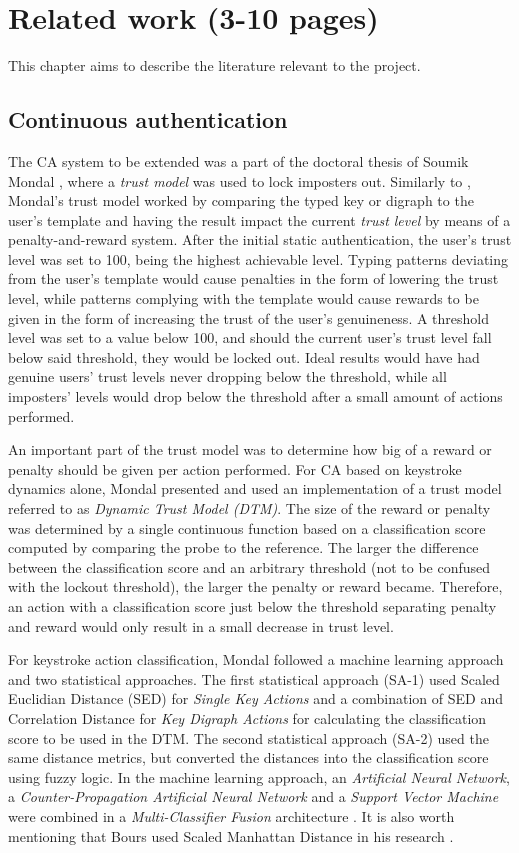 \documentclass[informationsecurity]{gucmasterproject}
\begin{document}
\chapter{Related work (3-10 pages)}
This chapter aims to describe the literature relevant to the project.


\section{Continuous authentication}
\label{sec:related-CA}
The CA system to be extended was a part of the doctoral thesis of Soumik Mondal \cite{mondal}, where a \textit{trust model} was used to lock imposters out.
Similarly to \cite{BOURS201236}, Mondal's trust model worked by comparing the typed key or digraph to the user's template and having the result impact the current \textit{trust level} by means of a penalty-and-reward system.
After the initial static authentication, the user's trust level was set to 100, being the highest achievable level.
Typing patterns deviating from the user's template would cause penalties in the form of lowering the trust level, while patterns complying with the template would cause rewards to be given in the form of increasing the trust of the user's genuineness.
A threshold level was set to a value below 100, and should the current user's trust level fall below said threshold, they would be locked out.
Ideal results would have had genuine users' trust levels never dropping below the threshold, while all imposters' levels would drop below the threshold after a small amount of actions performed.

An important part of the trust model was to determine how big of a reward or penalty should be given per action performed.
For CA based on keystroke dynamics alone, Mondal \cite{mondal} presented and used an implementation of a trust model referred to as \textit{Dynamic Trust Model (DTM)}.
The size of the reward or penalty was determined by a single continuous function based on a classification score computed by comparing the probe to the reference.
The larger the difference between the classification score and an arbitrary threshold (not to be confused with the lockout threshold), the larger the penalty or reward became.
Therefore, an action with a classification score just below the threshold separating penalty and reward would only result in a small decrease in trust level.

For keystroke action classification, Mondal followed a machine learning approach and two statistical approaches.
The first statistical approach (SA-1) used Scaled Euclidian Distance (SED) for \textit{Single Key Actions} and a combination of SED and Correlation Distance for \textit{Key Digraph Actions} for calculating the classification score to be used in the DTM. 
The second statistical approach (SA-2) used the same distance metrics, but converted the distances into the classification score using fuzzy logic.
In the machine learning approach, an \textit{Artificial Neural Network}, a \textit{Counter-Propagation Artificial Neural Network} and a \textit{Support Vector Machine} were combined in a \textit{Multi-Classifier Fusion} architecture \cite{mondal}. It is also worth mentioning that Bours used Scaled Manhattan Distance in his research \cite{BOURS201236}.
\end{document}
